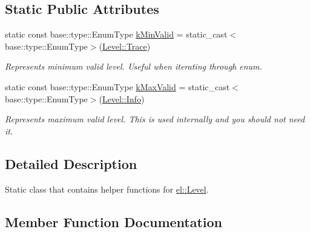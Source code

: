\subsection*{Static Public Attributes}
\begin{DoxyCompactItemize}
\item 
\mbox{\label{classel_1_1_level_helper_a3ecfe43d5b242e9946bad7f61ea4d89d}} 
static const base\+::type\+::\+Enum\+Type \hyperlink{classel_1_1_level_helper_a3ecfe43d5b242e9946bad7f61ea4d89d}{k\+Min\+Valid} = static\+\_\+cast$<$base\+::type\+::\+Enum\+Type$>$(\hyperlink{namespaceel_ab0ac6091262344c52dd2d3ad099e8e36add4ec0ac4e58f7c32a01244ae91150b1}{Level\+::\+Trace})
\begin{DoxyCompactList}\small\item\em Represents minimum valid level. Useful when iterating through enum. \end{DoxyCompactList}\item 
\mbox{\label{classel_1_1_level_helper_aa06e80c65db5c336c4aad25872cf9a48}} 
static const base\+::type\+::\+Enum\+Type \hyperlink{classel_1_1_level_helper_aa06e80c65db5c336c4aad25872cf9a48}{k\+Max\+Valid} = static\+\_\+cast$<$base\+::type\+::\+Enum\+Type$>$(\hyperlink{namespaceel_ab0ac6091262344c52dd2d3ad099e8e36a4059b0251f66a18cb56f544728796875}{Level\+::\+Info})
\begin{DoxyCompactList}\small\item\em Represents maximum valid level. This is used internally and you should not need it. \end{DoxyCompactList}\end{DoxyCompactItemize}


\subsection{Detailed Description}
Static class that contains helper functions for \hyperlink{namespaceel_ab0ac6091262344c52dd2d3ad099e8e36}{el\+::\+Level}. 

\subsection{Member Function Documentation}
\mbox{\label{classel_1_1_level_helper_a4ff401c62931609c849d580fb6ad2028}} 

